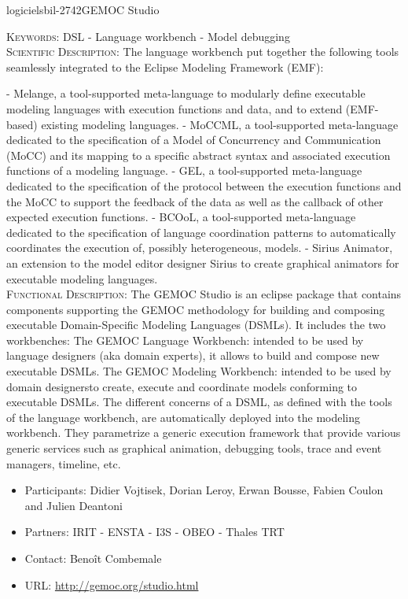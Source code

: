 \documentclass{ra2018}
\begin{document}
 \begin{module}{logiciels}{bil-2742}{GEMOC Studio}

   \textsc{Keywords:} DSL - Language workbench - Model debugging \\ 


    \textsc{Scientific Description:} The language workbench put together the following tools seamlessly integrated to the Eclipse Modeling Framework (EMF):

- Melange, a tool-supported meta-language to modularly define executable modeling languages with execution functions and data, and to extend (EMF-based) existing modeling languages.
- MoCCML, a tool-supported meta-language dedicated to the specification of a Model of Concurrency and Communication (MoCC) and its mapping to a specific abstract syntax and associated execution functions of a modeling language.
- GEL, a tool-supported meta-language dedicated to the specification of the protocol between the execution functions and the MoCC to support the feedback of the data as well as the callback of other expected execution functions.
- BCOoL, a tool-supported meta-language dedicated to the specification of language coordination patterns to automatically coordinates the execution of, possibly heterogeneous, models.
- Sirius Animator, an extension to the model editor designer Sirius to create graphical animators for executable modeling languages.\\

 \textsc{Functional Description:}  The GEMOC Studio is an eclipse package that contains components supporting the GEMOC methodology for building and composing executable Domain-Specific Modeling Languages (DSMLs). It includes the two workbenches:
    The GEMOC Language Workbench: intended to be used by language designers (aka domain experts), it allows to build and compose new executable DSMLs.
    The GEMOC Modeling Workbench: intended to be used by domain designersto create, execute and coordinate models conforming to executable DSMLs. The different concerns of a DSML, as defined with the tools of the language workbench, are automatically deployed into the modeling workbench. They parametrize a generic execution framework that provide various generic services such as graphical animation, debugging tools, trace and event managers, timeline, etc.\\

   \begin{itemize}
      \item Participants: Didier Vojtisek, Dorian Leroy, Erwan Bousse, Fabien Coulon and Julien Deantoni
      \item Partners: IRIT - ENSTA - I3S - OBEO - Thales TRT
      \item Contact: Benoît Combemale
      \item URL: \url{http://gemoc.org/studio.html}
   \end{itemize}

 \end{module}
\end{document}

